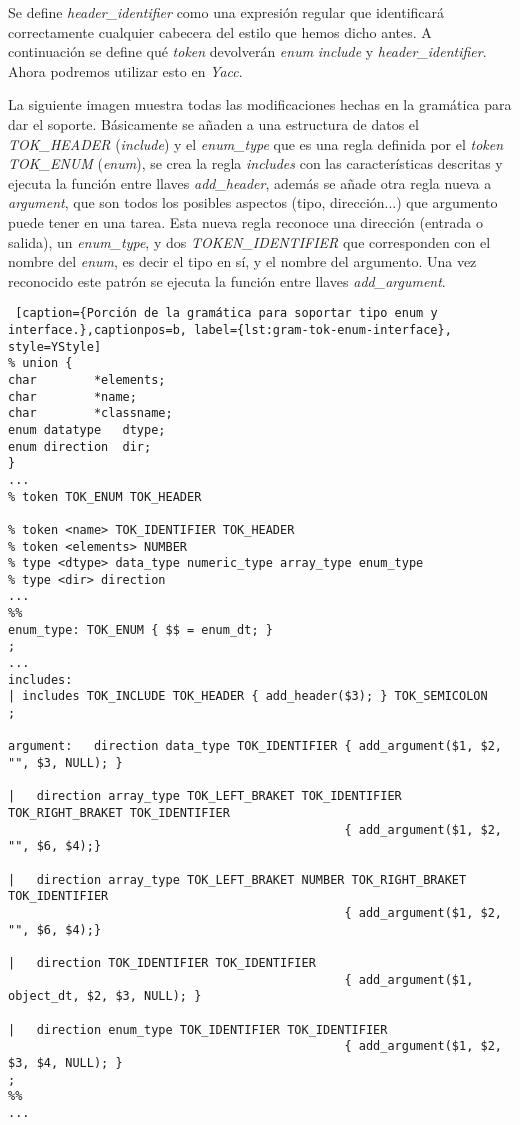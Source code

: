 \bigskip

Se define \textit{header\_identifier} como una expresión regular que identificará correctamente cualquier cabecera del estilo que hemos dicho antes. A continuación se define qué \textit{token} devolverán \textit{enum} \textit{include} y \textit{header\_identifier}. Ahora podremos utilizar esto en \textit{Yacc}.

\bigskip

La siguiente imagen muestra todas las modificaciones hechas en la gramática para dar el soporte. Básicamente se añaden a una estructura de datos el \textit{TOK\_HEADER} (\textit{include}) y el \textit{enum\_type} que es una regla definida por el \textit{token} \textit{TOK\_ENUM} (\textit{enum}), se crea la regla \textit{includes} con las características descritas y ejecuta la función entre llaves \textit{add\_header}, además se añade otra regla nueva a \textit{argument}, que son todos los posibles aspectos (tipo, dirección...) que argumento puede tener en una tarea. Esta nueva regla reconoce una dirección (entrada o salida), un \textit{enum\_type}, y dos \textit{TOKEN\_IDENTIFIER} que corresponden con el nombre del \textit{enum}, es decir el tipo en sí, y el nombre del argumento. Una vez reconocido este patrón se ejecuta la función entre llaves \textit{add\_argument}.

\bigskip

\begin{minipage}{\linewidth}
\begin{lstlisting} [caption={Porción de la gramática para soportar tipo enum y interface.},captionpos=b, label={lst:gram-tok-enum-interface}, style=YStyle]
% union {
char        *elements;
char        *name;
char        *classname;
enum datatype   dtype;
enum direction  dir;
}
... 
% token TOK_ENUM TOK_HEADER

% token <name> TOK_IDENTIFIER TOK_HEADER
% token <elements> NUMBER
% type <dtype> data_type numeric_type array_type enum_type
% type <dir> direction
...
%%
enum_type: TOK_ENUM { $$ = enum_dt; }
;
...
includes: 
| includes TOK_INCLUDE TOK_HEADER { add_header($3); } TOK_SEMICOLON
;

argument:   direction data_type TOK_IDENTIFIER { add_argument($1, $2, "", $3, NULL); }

|   direction array_type TOK_LEFT_BRAKET TOK_IDENTIFIER TOK_RIGHT_BRAKET TOK_IDENTIFIER 
											   { add_argument($1, $2, "", $6, $4);}
											   
|   direction array_type TOK_LEFT_BRAKET NUMBER TOK_RIGHT_BRAKET TOK_IDENTIFIER 
											   { add_argument($1, $2, "", $6, $4);}
											   
|   direction TOK_IDENTIFIER TOK_IDENTIFIER 
											   { add_argument($1, object_dt, $2, $3, NULL); }
											   
|   direction enum_type TOK_IDENTIFIER TOK_IDENTIFIER 
											   { add_argument($1, $2, $3, $4, NULL); }
;
%%
...
\end{lstlisting}
\end{minipage}

